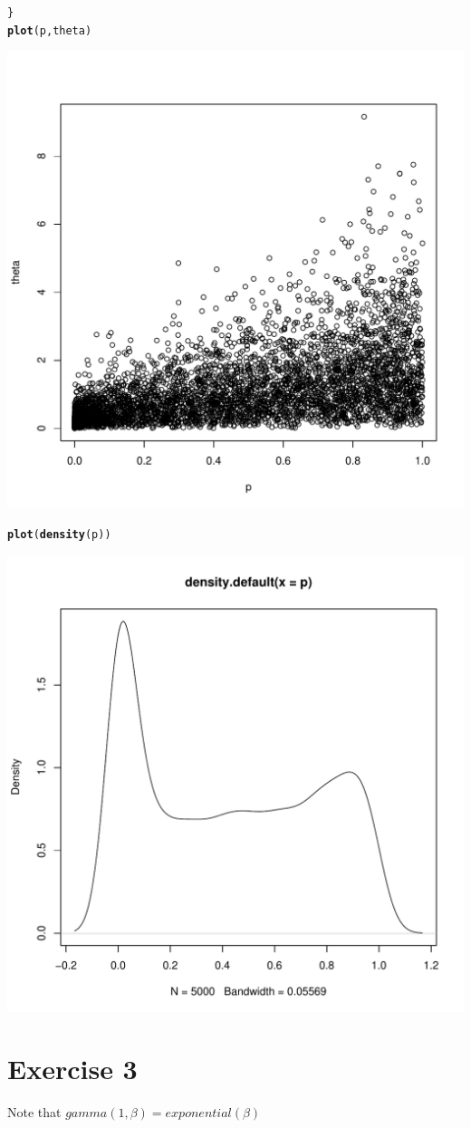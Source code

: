 \documentclass{article}\usepackage[]{graphicx}\usepackage[]{color}
\makeatletter
\newcommand{\hlstd}[1]{\textcolor[rgb]{0.345,0.345,0.345}{#1}}%
\newcommand{\hlkwd}[1]{\textcolor[rgb]{0.737,0.353,0.396}{\textbf{#1}}}%
\newenvironment{kframe}{%
 \def\at@end@of@kframe{}%
 \ifinner\ifhmode%
  \def\at@end@of@kframe{\end{minipage}}%
  \begin{minipage}{\columnwidth}%
 \fi\fi%
 \def\FrameCommand##1{\hskip\@totalleftmargin \hskip-\fboxsep
 \colorbox{shadecolor}{##1}\hskip-\fboxsep
     \hskip-\linewidth \hskip-\@totalleftmargin \hskip\columnwidth}%
 \MakeFramed {\advance\hsize-\width
   \@totalleftmargin\z@ \linewidth\hsize
   \@setminipage}}%
 {\par\unskip\endMakeFramed%
 \at@end@of@kframe}
\newenvironment{knitrout}{}{} %
\makeatother
\begin{document}
\begin{knitrout}
\begin{kframe}
\begin{alltt}
 \hlstd{\}}
\hlkwd{plot}\hlstd{(p, theta)}
\end{alltt}
\end{kframe}
\includegraphics[width=0.60\linewidth]{figure/unnamed-chunk-3-1} 
\begin{kframe}\begin{alltt}
\hlkwd{plot}\hlstd{(}\hlkwd{density}\hlstd{(p))}
\end{alltt}
\end{kframe}
\includegraphics[width=0.60\linewidth]{figure/unnamed-chunk-3-2} 

\end{knitrout}

\section*{Exercise 3}
Note that $gamma(1,\beta)=exponential(\beta)$
\end{document}
